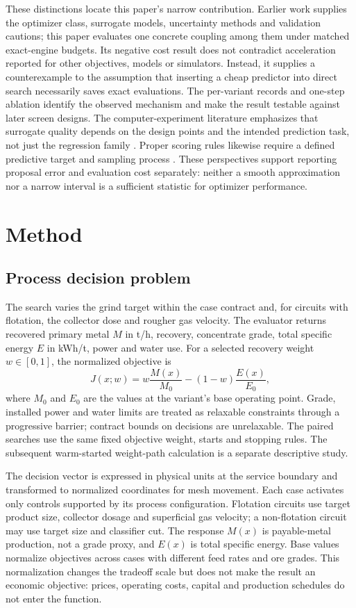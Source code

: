 \documentclass[10pt]{article}
\begin{document}
These distinctions locate this paper's narrow contribution. Earlier work supplies the optimizer class, surrogate models, uncertainty methods and validation cautions; this paper evaluates one concrete coupling among them under matched exact-engine budgets. Its negative cost result does not contradict acceleration reported for other objectives, models or simulators. Instead, it supplies a counterexample to the assumption that inserting a cheap predictor into direct search necessarily saves exact evaluations. The per-variant records and one-step ablation identify the observed mechanism and make the result testable against later screen designs. The computer-experiment literature emphasizes that surrogate quality depends on the design points and the intended prediction task, not just the regression family \cite{Sacks1989}. Proper scoring rules likewise require a defined predictive target and sampling process \cite{GneitingRaftery2007}. These perspectives support reporting proposal error and evaluation cost separately: neither a smooth approximation nor a narrow interval is a sufficient statistic for optimizer performance.

\section{Method}
\subsection{Process decision problem}
The search varies the grind target within the case contract and, for circuits with flotation, the collector dose and rougher gas velocity. The evaluator returns recovered primary metal $M$ in t/h, recovery, concentrate grade, total specific energy $E$ in kWh/t, power and water use. For a selected recovery weight $w\in[0,1]$, the normalized objective is
\begin{equation}
 J(x;w)=w\frac{M(x)}{M_0}-(1-w)\frac{E(x)}{E_0},
\end{equation}
where $M_0$ and $E_0$ are the values at the variant's base operating point. Grade, installed power and water limits are treated as relaxable constraints through a progressive barrier; contract bounds on decisions are unrelaxable. The paired searches use the same fixed objective weight, starts and stopping rules. The subsequent warm-started weight-path calculation is a separate descriptive study.

The decision vector is expressed in physical units at the service boundary and transformed to normalized coordinates for mesh movement. Each case activates only controls supported by its process configuration. Flotation circuits use target product size, collector dosage and superficial gas velocity; a non-flotation circuit may use target size and classifier cut. The response $M(x)$ is payable-metal production, not a grade proxy, and $E(x)$ is total specific energy. Base values normalize objectives across cases with different feed rates and ore grades. This normalization changes the tradeoff scale but does not make the result an economic objective: prices, operating costs, capital and production schedules do not enter the function.
\end{document}
